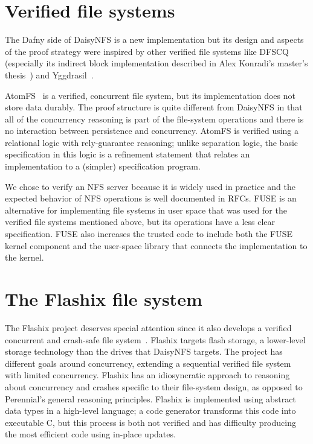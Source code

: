 \section{Verified file systems}
\label{sec:rel:verified-fs}

The Dafny side of DaisyNFS is a new implementation but its design and aspects of
the proof strategy were inspired by other verified file systems like
DFSCQ~\cite{chen:dfscq} (especially its indirect block implementation described
in Alex Konradi's master's thesis~\cite{akonradi-meng}) and
Yggdrasil~\cite{sigurbjarnarson:yggdrasil}.

AtomFS~\cite{zou:atomfs} is a verified, concurrent file system, but its
implementation does not store data durably. The proof structure is quite
different from DaisyNFS in that all of the concurrency reasoning is part of the
file-system operations and there is no interaction between persistence and
concurrency. AtomFS is verified using a relational logic with rely-guarantee
reasoning; unlike separation logic, the basic specification in this logic is a
refinement statement that relates an implementation to a (simpler) specification
program.

We chose to verify an NFS server because it is widely used in practice and the
expected behavior of NFS operations is well documented in RFCs. FUSE is an
alternative for implementing file systems in user space that was used for the
verified file systems mentioned above, but its operations have a less clear
specification. FUSE also increases the trusted code to include both the FUSE
kernel component and the user-space library that connects the implementation to
the kernel.

\section{The Flashix file system}
\label{sec:rel:flashix}

The Flashix project deserves special attention since it also develops a verified
concurrent and crash-safe file system~\cite{bodenmuller:concurrent-flashix}.
Flashix targets flash storage, a lower-level storage technology than the drives
that DaisyNFS targets. The project has different goals around concurrency,
extending a sequential verified file system with limited concurrency. Flashix
has an idiosyncratic approach to reasoning about concurrency and crashes
specific to their file-system design, as opposed to Perennial's general
reasoning principles. Flashix is implemented using abstract data types in a
high-level language; a code generator transforms this code into executable C,
but this process is both not verified and has difficulty producing the most
efficient code using in-place updates.

